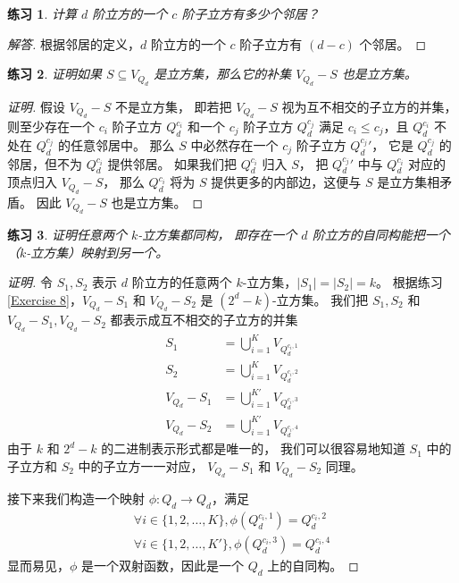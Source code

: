 \documentclass[12pt, a4paper]{article}
\newtheorem{exercisewithanswer}{练习}
\newenvironment{answer}[1][Answer]{
	\begin{proof}[#1]
	\let\qed\relax
}{
	\end{proof}
}
\begin{document}
\begin{exercisewithanswer}
计算 $d$ 阶立方的一个 $c$ 阶子立方有多少个邻居？
\end{exercisewithanswer}

\begin{answer}[解答]
根据邻居的定义，$d$ 阶立方的一个 $c$ 阶子立方有 $(d - c)$ 个邻居。
\end{answer}

\begin{exercisewithanswer}
证明如果 $S \subseteq V_{Q_d}$ 是立方集，那么它的补集 $V_{Q_d} − S$ 也是立方集。
\end{exercisewithanswer}

\begin{proof}[证明]
假设 $V_{Q_d} − S$ 不是立方集，
即若把 $V_{Q_d} − S$ 视为互不相交的子立方的并集，
则至少存在一个 $c_i$ 阶子立方 $Q_d^{c_i}$ 和一个 $c_j$ 阶子立方 $Q_d^{c_j}$
满足 $c_i \le c_j$，且 $Q_d^{c_i}$ 不处在 $Q_d^{c_j}$ 的任意邻居中。
那么 $S$ 中必然存在一个 $c_j$ 阶子立方 ${Q_d^{c_j}}'$，
它是 $Q_d^{c_j}$ 的邻居，但不为 $Q_d^{c_i}$ 提供邻居。
如果我们把 $Q_d^{c_i}$ 归入 $S$，
把 ${Q_d^{c_j}}'$ 中与 $Q_d^{c_i}$ 对应的顶点归入 $V_{Q_d} − S$，
那么 $Q_d^{c_i}$ 将为 $S$ 提供更多的内部边，这便与 $S$ 是立方集相矛盾。
因此 $V_{Q_d} − S$ 也是立方集。
\end{proof}

\begin{exercisewithanswer}
证明任意两个 $k$-立方集都同构，
即存在一个 $d$ 阶立方的自同构能把一个（$k$-立方集）映射到另一个。
\end{exercisewithanswer}

\begin{proof}[证明]
令 $S_1, S_2$ 表示 $d$ 阶立方的任意两个 $k$-立方集，$|S_1| = |S_2| = k$。
根据练习 \ref{Exercise 8}，$V_{Q_d} - S_1$ 和 $V_{Q_d} - S_2$ 是 $(2^d - k)$-立方集。
我们把 $S_1, S_2$ 和 $V_{Q_d} - S_1, V_{Q_d} - S_2$ 都表示成互不相交的子立方的并集
\begin{align*}
S_1           & = \bigcup_{i = 1}^K V_{Q_d^{c_i, 1}} \\
S_2           & = \bigcup_{i = 1}^K V_{Q_d^{c_i, 2}} \\
V_{Q_d} - S_1 & = \bigcup_{i = 1}^{K'} V_{Q_d^{c_i, 3}} \\
V_{Q_d} - S_2 & = \bigcup_{i = 1}^{K'} V_{Q_d^{c_i, 4}}
\end{align*}
由于 $k$ 和 $2^d - k$ 的二进制表示形式都是唯一的，
我们可以很容易地知道 $S_1$ 中的子立方和 $S_2$ 中的子立方一一对应，
$V_{Q_d} - S_1$ 和 $V_{Q_d} - S_2$ 同理。

接下来我们构造一个映射 $\phi \colon Q_d \rightarrow Q_d$，满足
\begin{align*}
\forall i \in \{1, 2, \dots, K\}, \phi(Q_d^{c_i, 1}) = Q_d^{c_i, 2} \\
\forall i \in \{1, 2, \dots, K'\}, \phi(Q_d^{c_i, 3}) = Q_d^{c_i, 4}
\end{align*}
显而易见，$\phi$ 是一个双射函数，因此是一个 $Q_d$ 上的自同构。
\end{proof}
\end{document}
